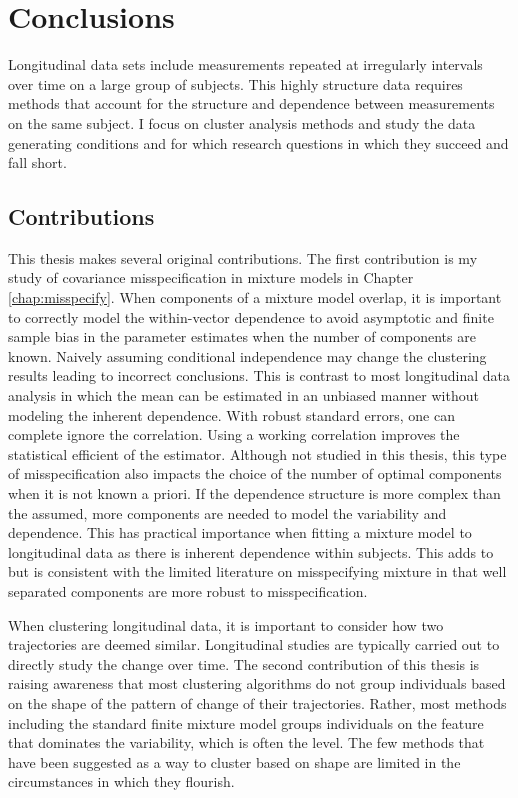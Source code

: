 \chapter{Conclusions}
\label{chap:concl}
Longitudinal data sets include measurements repeated at irregularly intervals over time on a large group of subjects. This highly structure data requires methods that account for the structure and dependence between measurements on the same subject. I focus on cluster analysis methods and study the data generating conditions and for which research questions in which they succeed and fall short. 

\section{Contributions}
This thesis makes several original contributions. The first contribution is my study of covariance misspecification in mixture models in Chapter \ref{chap:misspecify}. When components of a mixture model overlap, it is important to correctly model the within-vector dependence to avoid asymptotic and finite sample bias in the parameter estimates when the number of components are known. Naively assuming conditional independence may change the clustering results leading to incorrect conclusions. This is contrast to most longitudinal data analysis in which the mean can be estimated in an unbiased manner without modeling the inherent dependence. With robust standard errors, one can complete ignore the correlation. Using a working correlation improves the statistical efficient of the estimator. Although not studied in this thesis, this type of misspecification also impacts the choice of the number of optimal components when it is not known a priori. If the dependence structure is more complex than the assumed, more components are needed to model the variability and dependence. This has practical importance when fitting a mixture model to longitudinal data as there is inherent dependence within subjects. This adds to but is consistent with the limited literature on misspecifying mixture in that well separated components are more robust to misspecification. 

When clustering longitudinal data, it is important to consider how two trajectories are deemed similar. Longitudinal studies are typically carried out to directly study the change over time. The second contribution of this thesis is raising awareness that most clustering algorithms do not group individuals based on the shape of the pattern of change of their trajectories.  Rather, most methods including the standard finite mixture model groups individuals on the feature that dominates the variability, which is often the level. The few methods that have been suggested as a way to cluster based on shape are limited in the circumstances in which they flourish.

